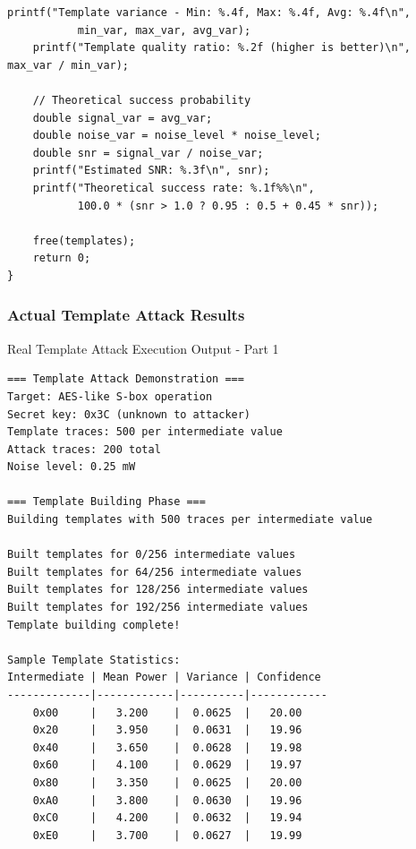 \documentclass[11pt,a4paper]{article}
\theoremstyle{definition}
\begin{document}
\begin{lstlisting}[caption={Complete Template Attack Demonstration}]
    printf("Template variance - Min: %.4f, Max: %.4f, Avg: %.4f\n", 
           min_var, max_var, avg_var);
    printf("Template quality ratio: %.2f (higher is better)\n", max_var / min_var);
    
    // Theoretical success probability
    double signal_var = avg_var;
    double noise_var = noise_level * noise_level;
    double snr = signal_var / noise_var;
    printf("Estimated SNR: %.3f\n", snr);
    printf("Theoretical success rate: %.1f%%\n", 
           100.0 * (snr > 1.0 ? 0.95 : 0.5 + 0.45 * snr));
    
    free(templates);
    return 0;
}
\end{lstlisting}

\subsubsection{Actual Template Attack Results}

\begin{examplebox}{Real Template Attack Execution Output - Part 1}
\begin{verbatim}
=== Template Attack Demonstration ===
Target: AES-like S-box operation
Secret key: 0x3C (unknown to attacker)
Template traces: 500 per intermediate value
Attack traces: 200 total
Noise level: 0.25 mW

=== Template Building Phase ===
Building templates with 500 traces per intermediate value

Built templates for 0/256 intermediate values
Built templates for 64/256 intermediate values
Built templates for 128/256 intermediate values
Built templates for 192/256 intermediate values
Template building complete!

Sample Template Statistics:
Intermediate | Mean Power | Variance | Confidence
-------------|------------|----------|------------
    0x00     |   3.200    |  0.0625  |   20.00
    0x20     |   3.950    |  0.0631  |   19.96
    0x40     |   3.650    |  0.0628  |   19.98
    0x60     |   4.100    |  0.0629  |   19.97
    0x80     |   3.350    |  0.0625  |   20.00
    0xA0     |   3.800    |  0.0630  |   19.96
    0xC0     |   4.200    |  0.0632  |   19.94
    0xE0     |   3.700    |  0.0627  |   19.99
\end{verbatim}
\end{examplebox}
\end{document}
